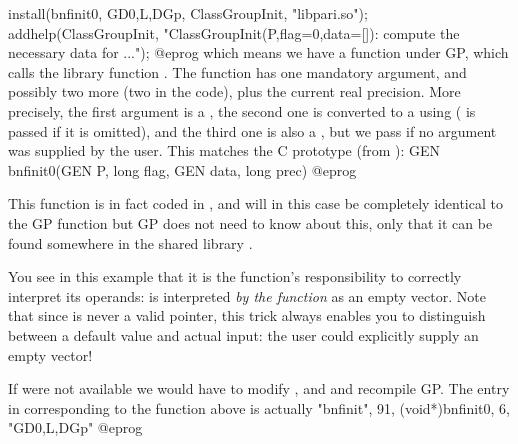\bprog
{
  install(bnfinit0, GD0,L,DGp, ClassGroupInit, "libpari.so");
  addhelp(ClassGroupInit, "ClassGroupInit(P,{flag=0},{data=[]}):
    compute the necessary data for ...");
}
@eprog
which means we have a function  under GP, which calls
the library function  . The function has one mandatory
argument, and possibly two more (two  in the code), plus the
current real precision. More precisely, the first argument is a ,
the second one is converted to a  using  ( is
passed if it is omitted), and the third one is also a , but we
pass  if no argument was supplied by the user. This matches the C
prototype (from ):
%
\bprog
  GEN bnfinit0(GEN P, long flag, GEN data, long prec)
@eprog

This function is in fact coded in , and will in this
case be completely identical to the GP function  but GP does
not need to know about this, only that it can be found somewhere in the
shared library .

 You see in this example that it is the
function's responsibility to correctly interpret its operands:  is interpreted {\it by the function\/} as an empty vector. Note that
since  is never a valid  pointer, this trick always
enables you to distinguish between a default value and actual input: the
user could explicitly supply an empty vector!

 If  were not available we would have to
modify , and  and
recompile GP. The entry in  corresponding to the
function above is actually
\bprog
{ "bnfinit", 91, (void*)bnfinit0, 6, "GD0,L,DGp" }
@eprog
\vfill\eject
